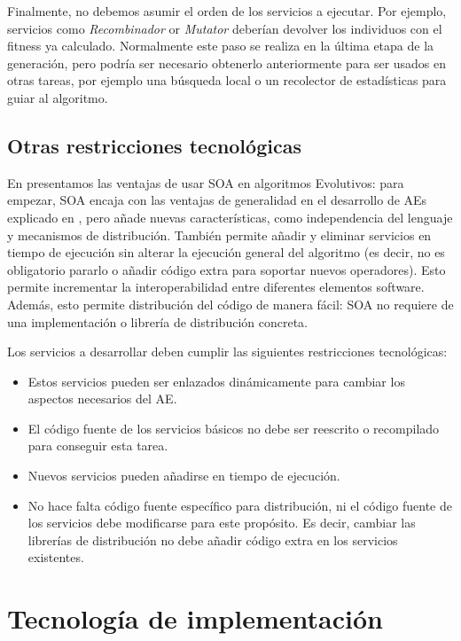 \documentclass[runningheads]{llncs}
\begin{document}
Finalmente, no debemos asumir el orden de los servicios a ejecutar. Por ejemplo, servicios como {\em Recombinador} or {\em Mutator} deberían devolver los individuos con el fitness ya calculado. Normalmente este paso se realiza en la última etapa de la generación, pero podría ser necesario obtenerlo anteriormente para ser usados en otras tareas, por ejemplo una búsqueda local o un recolector de estadísticas para guiar al algoritmo.

\subsection{Otras restricciones tecnológicas}

En \cite{OSGILIATH} presentamos las ventajas de usar SOA en algoritmos Evolutivos: para empezar, SOA encaja con las ventajas de generalidad en el desarrollo de AEs explicado en \cite{GENERICITY05}, pero añade nuevas características, como independencia del lenguaje y mecanismos de distribución. También permite añadir y eliminar servicios en tiempo de ejecución sin alterar la ejecución general del algoritmo (es decir, no es obligatorio pararlo o añadir código extra para soportar nuevos operadores). Esto permite incrementar la interoperabilidad entre diferentes elementos software. Además, esto permite distribución del código de manera fácil: SOA no requiere de una implementación o librería de distribución concreta.

Los servicios a desarrollar deben cumplir las siguientes restricciones tecnológicas:
\begin{itemize}
\item Estos servicios pueden ser enlazados dinámicamente para cambiar los aspectos necesarios del AE.
\item El código fuente de los servicios básicos no debe ser reescrito o recompilado para conseguir esta tarea.
\item Nuevos servicios pueden añadirse en tiempo de ejecución.
\item No hace falta código fuente específico para distribución, ni el código fuente de los servicios debe modificarse para este propósito. Es decir, cambiar las librerías de distribución no debe añadir código extra en los servicios existentes.
\end{itemize}

\section{Tecnología de implementación}
\label{sec:technology}
\end{document}
